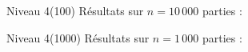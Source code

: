 \begin{frame}{Niveau 4(100)}
Résultats sur $n=10\,000$ parties :
\begin{center}
\end{center}
\end{frame}

\begin{frame}{Niveau 4(1000)}
Résultats sur $n=1\,000$ parties :
\begin{center}
\end{center}
\end{frame}

